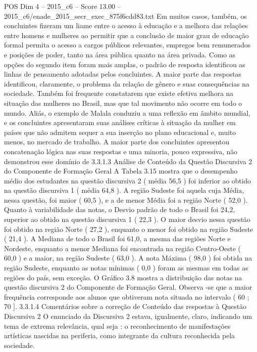 \begin{textsample}{POS Dim 4 – 2015\_c6 – Score 13.00 – 2015\_c6/enade\_2015\_secr\_exec\_875f6cdd83.txt}
Em muitos casos, também, os concluintes fizeram um liame entre o acesso à educação e a melhora das relações entre homens e mulheres ao permitir que a conclusão de maior grau de educação formal permita o acesso a cargos públicos relevantes, empregos bem remunerados e posições de poder, tanto na área pública quanto na área privada.
Como as opções do segundo item foram mais amplas, o padrão de resposta identificou as linhas de pensamento adotadas pelos concluintes.
A maior parte das respostas identificou, claramente, o problema da relação de gênero e suas consequências na sociedade.
Também foi frequente constatarem que existe efetiva melhora na situação das mulheres no Brasil, mas que tal movimento não ocorre em todo o mundo.
Aliás, o exemplo de Malala conduziu a uma reflexão em âmbito mundial, e os concluintes apresentaram suas análises críticas à situação da mulher em países que não admitem sequer a sua inserção no plano educacional e, muito menos, no mercado de trabalho.
A maior parte dos concluintes apresentou concatenação lógica nas suas respostas e uma minoria, pouco expressiva, não demonstrou esse domínio de 3.3.1.3 Análise de Conteúdo da Questão Discursiva 2 do Componente de Formação Geral A Tabela 3.15 mostra que o desempenho médio dos estudantes na questão discursiva 2 ( média 56,5 ) foi inferior ao obtido na questão discursiva 1 ( média 64,8 ).
A região Sudeste foi aquela cuja Média, nessa questão, foi maior ( 60,5 ), e a de menor Média foi a região Norte ( 52,0 ).
Quanto à variabilidade das notas, o Desvio padrão de todo o Brasil foi 24,2, superior ao obtido na questão discursiva 1 ( 22,3 ).
O maior desvio nessa questão foi obtido na região Norte ( 27,2 ), enquanto o menor foi obtido na região Sudeste ( 21,4 ).
A Mediana de todo o Brasil foi 61,0, a mesma das regiões Norte e Nordeste, enquanto a menor Mediana foi encontrada na região Centro-Oeste ( 60,0 ) e a maior, na região Sudeste ( 63,0 ).
A nota Máxima ( 98,0 ) foi obtida na região Sudeste, enquanto as notas mínimas ( 0,0 ) foram as mesmas em todas as regiões do país, sem exceção.
O Gráfico 3.8 mostra a distribuição das notas na questão discursiva 2 do Componente de Formação Geral.
Observa -se que a maior frequência corresponde aos alunos que obtiveram nota situada no intervalo ( 60 ; 70 ]. 3.3.1.4 Comentários sobre a correção de Conteúdo das respostas à Questão Discursiva 2 O enunciado da Discursiva 2 estava, igualmente, claro, indicando um tema de extrema relevância, qual seja : o reconhecimento de manifestações artísticas nascidas na periferia, como integrante da cultura reconhecida pela sociedade.

\end{textsample}
